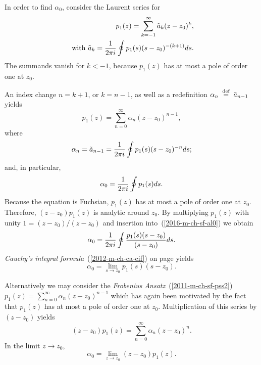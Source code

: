 {\color{OliveGreen}
\bproof

In order to find {$\alpha_0$}, consider the Laurent series for
\begin{equation}
\begin{split}
   p_1(z)=\sum_{k=-1}^\infty \tilde a_k(z-z_0)^k, \\
\textrm{ with }
   \tilde a_k={1\over 2\pi i}\oint p_1(s)(s-z_0)^{-(k+1)}ds.
\end{split}
\end{equation}
The summands  vanish  for $k<-1$, because $p_1(z)$ has at most a pole of order one at $z_0$.

An index change $n=k+1$, or  $k=n-1$,  as well as a redefinition
$\alpha_n \stackrel{{\tiny \textrm{ def }}}{=} \tilde a_{n-1}$
yields
\begin{equation}
p_1(z) =\sum_{n=0}^\infty \alpha_n(z-z_0)^{n-1},
\end{equation}
where
\begin{equation}
 \alpha_n={\tilde a}_{n-1}={1\over 2\pi i}
\oint p_1(s)(s-z_0)^{-n}ds;
\end{equation}
and, in particular,
\begin{equation}
\alpha_0={1\over2\pi i}\oint p_1(s)ds.
\label{2016-m-ch-sf-al0}
\end{equation}
Because the equation is Fuchsian,  $p_1(z)$ has at most a pole of order one at $z_0$.
Therefore, $(z-z_0) p_1(z)$  is analytic around $z_0$.
By multiplying  $p_1(z)$ with unity $1=(z-z_0)/(z-z_0)$
and insertion into~(\ref{2016-m-ch-sf-al0}) we obtain
\begin{equation}
   \alpha_0={1\over2\pi i}\oint{p_1(s)(s-z_0)\over(s-z_0)}ds.
\end{equation}
{\em Cauchy's integral formula}~(\ref{2012-m-ch-ca-cif}) on page \pageref{2012-m-ch-ca-cif}
yields
\begin{equation}
   \alpha_0=\lim_{s\to z_0}p_1(s)(s-z_0).
\end{equation}

Alternatively we may consider the
{\it Frobenius Ansatz}~(\ref{2011-m-ch-sf-pss2})
$  p_1(z)=\sum_{n=0}^\infty\alpha_n(z-z_0)^{n-1}$
which has again been motivated by the fact that $p_1(z)$ has at most a pole of order one at $z_0$.
Multiplication of this series by $(z-z_0)$ yields
\begin{equation}
   (z-z_0)p_1(z)=\sum_{n=0}^\infty\alpha_n(z-z_0)^n .
\end{equation}
In the limit $z\to z_0$,
\begin{equation}
\alpha_0  = \lim_{z\to z_0}(z-z_0)p_1(z)
.
\end{equation}


}
